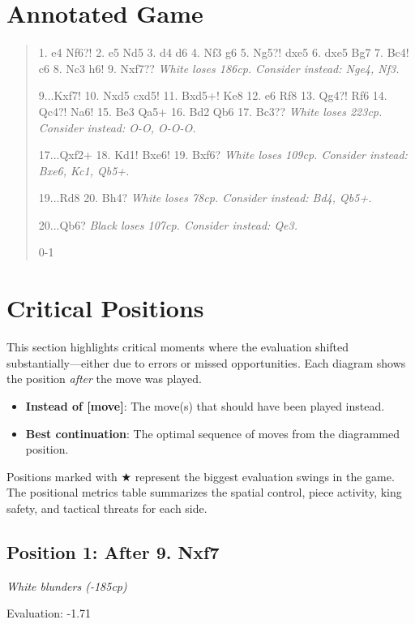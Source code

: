 \documentclass[11pt]{book}
\begin{document}
\section{Annotated Game}

\begin{quote}
1. e4 Nf6?!
2. e5 Nd5
3. d4 d6
4. Nf3 g6
5. Ng5?! dxe5
6. dxe5 Bg7
7. Bc4! c6
8. Nc3 h6!
9. Nxf7??
\textit{White loses 186cp. Consider instead: Nge4, Nf3.}

9...Kxf7!
10. Nxd5 cxd5!
11. Bxd5+! Ke8
12. e6 Rf8
13. Qg4?! Rf6
14. Qc4?! Na6!
15. Be3 Qa5+
16. Bd2 Qb6
17. Bc3??
\textit{White loses 223cp. Consider instead: O-O, O-O-O.}

17...Qxf2+
18. Kd1! Bxe6!
19. Bxf6?
\textit{White loses 109cp. Consider instead: Bxe6, Kc1, Qb5+.}

19...Rd8
20. Bh4?
\textit{White loses 78cp. Consider instead: Bd4, Qb5+.}

20...Qb6?
\textit{Black loses 107cp. Consider instead: Qe3.}


0-1
\end{quote}

\section{Critical Positions}

This section highlights critical moments where the evaluation shifted substantially---either due to errors or missed opportunities. Each diagram shows the position \emph{after} the move was played.

\begin{itemize}
\item \textbf{Instead of [move]}: The move(s) that should have been played instead.
\item \textbf{Best continuation}: The optimal sequence of moves from the diagrammed position.
\end{itemize}

Positions marked with {\color{blue}$\bigstar$} represent the biggest evaluation swings in the game. The positional metrics table summarizes the spatial control, piece activity, king safety, and tactical threats for each side.

\subsection*{Position 1: After 9. Nxf7}
\textit{White blunders (-185cp)}

Evaluation: -1.71
\end{document}
